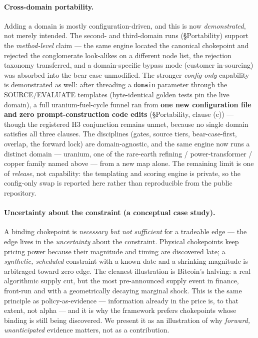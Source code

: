 \documentclass[11pt]{article}
\begin{document}
\paragraph{Cross-domain portability.} Adding a domain is mostly configuration-driven, and this is now
\emph{demonstrated}, not merely intended. The second- and third-domain runs (\S Portability) support
the \emph{method-level} claim --- the same engine located the canonical chokepoint and rejected the
conglomerate look-alikes on a different node list, the rejection taxonomy transferred, and a
domain-specific bypass mode (customer in-sourcing) was absorbed into the bear case unmodified. The
stronger \emph{config-only} capability is demonstrated as well: after threading a \texttt{domain} parameter
through the SOURCE/EVALUATE templates (byte-identical golden tests pin the live domain), a full
uranium-fuel-cycle funnel ran from \textbf{one new configuration file and zero prompt-construction code
edits} (\S Portability, clause (c)) --- though the registered H3 conjunction remains unmet, because no
single domain satisfies all three clauses. The disciplines (gates, source tiers, bear-case-first, overlap, the
forward lock) are domain-agnostic, and the same engine now runs a distinct domain --- uranium, one of
the rare-earth refining / power-transformer / copper family named above --- from a new map alone. The
remaining limit is one of \emph{release}, not capability: the templating and scoring engine is private,
so the config-only swap is reported here rather than reproducible from the public repository.

\paragraph{Uncertainty about the constraint (a conceptual case study).} A binding chokepoint is
\emph{necessary but not sufficient} for a tradeable edge --- the edge lives in the \emph{uncertainty}
about the constraint. Physical chokepoints keep pricing power because their magnitude and timing are
discovered late; a \emph{synthetic, scheduled} constraint with a known date and a shrinking magnitude
is arbitraged toward zero edge. The cleanest illustration is Bitcoin's halving: a real algorithmic
supply cut, but the most pre-announced supply event in finance, front-run and with a geometrically
decaying marginal shock. This is the same principle as policy-as-evidence --- information already in
the price is, to that extent, not alpha --- and it is why the framework prefers chokepoints whose
binding is still being discovered. We present it as an illustration of why \emph{forward,
unanticipated} evidence matters, not as a contribution.
\end{document}
